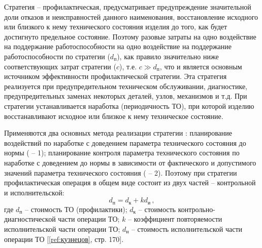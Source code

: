 \documentclass[../nirs.tex]{subfiles}
\begin{document}
Стратегия  -- профилактическая, предусматривает предупреждение
значительной доли отказов и неисправностей данного наименования, восстановление
исходного или близкого к нему технического состояния изделия до того, как будет
достигнуто предельное состояние. Поэтому разовые затраты на одно воздействие на
поддержание работоспособности на одно воздействие на поддержание
работоспособности по стратегии  ($d_{\text{п}}$), как правило значительно
ниже соответствующих затрат стратегии  ($c$), т.е. $c \gg d_{\text{п}}$,
что и является основным источником эффективности профилактической стратегии. Эта
стратегия реализуется при предупредительном техническом обслуживании,
диагностике, предупредительных заменах некоторых деталей, узлов, механизмов и
т.д. При стратегии  устанавливается наработка (периодичность ТО), при
которой изделию восстанавливают исходное или близкое к нему техническое
состояние.

Применяются два основных метода реализации стратегии : планирование
воздействий по наработке с доведением параметра технического состояния до нормы
( -- 1); планирование контроля параметра технического состояния по
наработке с доведением до нормы в зависимости от фактического и допустимого
значений параметра технического состояния ( -- 2). Поэтому при стратегии
 профилактическая операция в общем виде состоит из двух частей --
контрольной и исполнительской:
\begin{equation*}
    d_{\text{п}} = d_{\text{к}} + k d_{\text{и}}\,,
\end{equation*}
где $d_{\text{п}}$ -- стоимость ТО (профилактики); $d_{\text{к}}$ -- стоимость
контрольно-диагностической части операции ТО; $k$ -- коэффициент повторяемости
исполнительской части операции ТО; $d_{\text{н}}$ -- стоимость исполнительской
части операции ТО [\ref{ref:кузнецов}, стр. 170].
\end{document}
